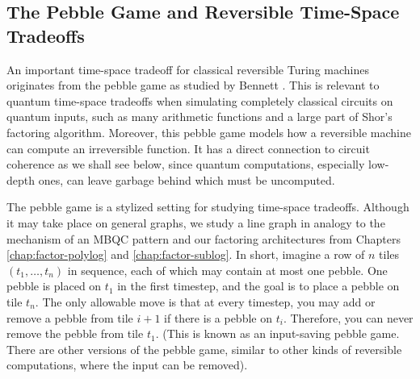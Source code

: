 



\subsection{The Pebble Game and Reversible Time-Space Tradeoffs}
\label{subsec:cohere-pebble}

An important time-space tradeoff for classical reversible Turing machines
originates from the pebble game as studied by Bennett \cite{Bennett1973}.
This is relevant to quantum time-space tradeoffs when simulating
completely classical circuits on quantum inputs, such as many arithmetic
functions and a large part of Shor's factoring algorithm. Moreover, this
pebble game models how a reversible machine can compute an irreversible
function. It has a direct connection to circuit coherence as we shall see
below, since quantum computations, especially low-depth ones, can leave
garbage behind which must be uncomputed.

The pebble game is a stylized setting for studying time-space tradeoffs.
Although it may take place on general graphs, we study a line graph
in analogy to the mechanism of an MBQC pattern and our factoring architectures
from Chapters \ref{chap:factor-polylog} and \ref{chap:factor-sublog}.
In short, imagine a row of $n$ tiles $(t_1, \ldots, t_n)$
in sequence, each of which may
contain at most one pebble. One pebble is placed
on $t_1$ in the first timestep, and the goal is to place a pebble
on tile $t_n$. The only allowable move is that at every timestep,
you may add or remove a pebble from tile $i+1$ if there is a pebble on
$t_i$. Therefore, you can never remove the pebble from tile $t_1$.
(This is known as an input-saving pebble game.
There are other versions of the pebble game, similar to other kinds of
reversible computations, where the input can be removed).

